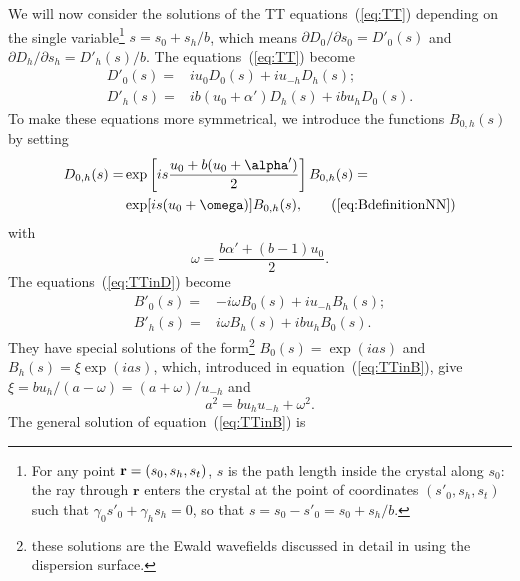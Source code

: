 \documentclass{iucr}
\begin{document}
We will now consider the solutions of the TT equations~(\ref{eq:TT}) depending on the single variable\footnote{
For any point $\textbf r=(s_0,s_h,s_t)$, $s$ is the path length inside the crystal along $s_0$: the ray through $\textbf{r}$ enters the crystal at the point of coordinates $(s'_0,s_h,s_t)$ such that $\gamma_0 s'_0+\gamma_h s_h = 0$, so that 
$s = s_0 - s'_0 = s_0 + s_h /b$.
}
$s=s_0+s_h / b$, which means 
$\partial D_{0} / \partial  s_{0}=D'_{0}(s)$ and $\partial D_{h} / \partial s_{h}=D'_{h}(s)/b$.
The equations~(\ref{eq:TT}) become
\begin{subequations}
\label{eq:TTinD}
\begin{align}
D'_0(s) =& i u_0 D_0(s) + i u_{-h} D_h(s); \\
D'_h(s) =& i b (u_0 + \alpha') D_h(s) + i b u_{h} D_0(s).
\end{align}
\end{subequations}
To make these equations more symmetrical, we introduce the functions $B_{0,h}(s)$ by setting
\begin{subequations}\label{eq:BdefinitionNN}
\begin{align}
D_{0,h}(s) =& 
\exp \left[ i s \frac{u_0 + b (u_0+\alpha')}{2} \right] B_{0,h}(s) = \nonumber \\ 
&\exp[i s (u_0+\omega)] B_{0,h}(s), \tag{\ref{eq:BdefinitionNN}}
\end{align}
\end{subequations}
with
\begin{equation}\label{eq:omega}
    \omega=\frac{ b \alpha' + (b-1) u_0}{2}.
\end{equation}
The
equations~(\ref{eq:TTinD}) become 
\begin{subequations}
\label{eq:TTinB}
\begin{align}
B'_0(s) =& -i \omega B_0(s) + i u_{-h} B_h(s); \\
B'_h(s) =& i \omega B_h(s) + i b u_{h} B_0(s).
\end{align}
\end{subequations}
They have special solutions of the form\footnote{these solutions are the Ewald wavefields discussed in detail in \cite{authierbook} using the dispersion surface.} $B_0(s)=\exp(i a s)$ and $B_h(s)=\xi \exp(i a s)$, which, introduced in equation~(\ref{eq:TTinB}), give $\xi=bu_h/(a-\omega)=(a+\omega)/u_{-h}$ and 
\begin{equation}\label{eq:a}
    a^2=b u_h u_{-h}+\omega^2.
\end{equation}
The general solution of equation~(\ref{eq:TTinB}) is
\end{document}
